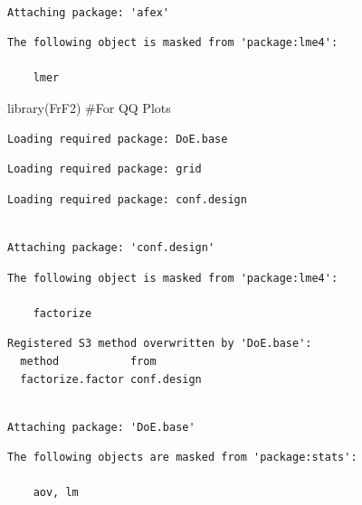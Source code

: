 \documentclass[
  letterpaper,
  DIV=11,
  numbers=noendperiod]{scrartcl}
\newenvironment{Shaded}{\begin{snugshade}}{\end{snugshade}}
\newcommand{\CommentTok}[1]{\textcolor[rgb]{0.37,0.37,0.37}{#1}}
\newcommand{\FunctionTok}[1]{\textcolor[rgb]{0.28,0.35,0.67}{#1}}
\newcommand{\NormalTok}[1]{\textcolor[rgb]{0.00,0.23,0.31}{#1}}
\begin{document}
\begin{verbatim}

Attaching package: 'afex'
\end{verbatim}

\begin{verbatim}
The following object is masked from 'package:lme4':

    lmer
\end{verbatim}

\begin{Shaded}
\begin{Highlighting}[]
\FunctionTok{library}\NormalTok{(FrF2) }\CommentTok{\#For QQ Plots}
\end{Highlighting}
\end{Shaded}

\begin{verbatim}
Loading required package: DoE.base
\end{verbatim}

\begin{verbatim}
Loading required package: grid
\end{verbatim}

\begin{verbatim}
Loading required package: conf.design
\end{verbatim}

\begin{verbatim}

Attaching package: 'conf.design'
\end{verbatim}

\begin{verbatim}
The following object is masked from 'package:lme4':

    factorize
\end{verbatim}

\begin{verbatim}
Registered S3 method overwritten by 'DoE.base':
  method           from       
  factorize.factor conf.design
\end{verbatim}

\begin{verbatim}

Attaching package: 'DoE.base'
\end{verbatim}

\begin{verbatim}
The following objects are masked from 'package:stats':

    aov, lm
\end{verbatim}
\end{document}
